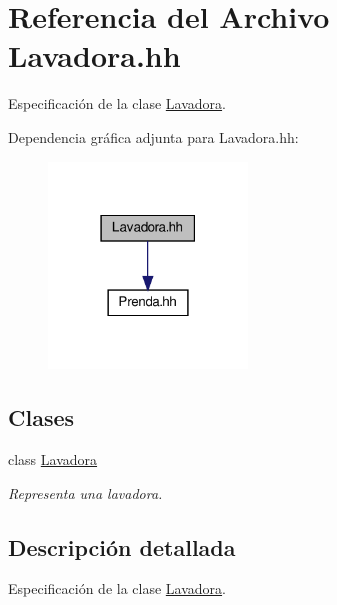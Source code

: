 \hypertarget{_lavadora_8hh}{}\section{Referencia del Archivo Lavadora.\+hh}
\label{_lavadora_8hh}


Especificación de la clase \mbox{\hyperlink{class_lavadora}{Lavadora}}.  


Dependencia gráfica adjunta para Lavadora.\+hh\+:\nopagebreak
\begin{figure}[H]
\begin{center}
\leavevmode
\includegraphics[width=150pt]{_lavadora_8hh__incl}
\end{center}
\end{figure}
\subsection*{Clases}
\begin{DoxyCompactItemize}
\item 
class \mbox{\hyperlink{class_lavadora}{Lavadora}}
\begin{DoxyCompactList}\small\item\em Representa una lavadora. \end{DoxyCompactList}\end{DoxyCompactItemize}


\subsection{Descripción detallada}
Especificación de la clase \mbox{\hyperlink{class_lavadora}{Lavadora}}. 

